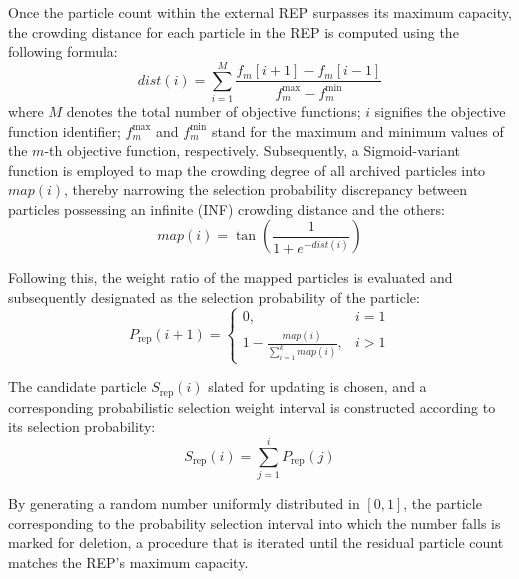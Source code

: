 \documentclass[lettersize,journal]{IEEEtran}
\begin{document}
Once the particle count within the external REP surpasses its maximum capacity, the crowding distance for each particle in the REP is computed using the following formula:
\begin{equation}
    dist(i)=\sum_{i=1}^{M}{\frac{f_m[i+1]-f_m[i-1]}{{f_m^{\text{max}}}-{f_m^{\text{min}}}}}
\end{equation}
where $M$ denotes the total number of objective functions; $i$ signifies the objective function identifier; $f_m^{\text{max}}$ and $f_m^{\text{min}}$ stand for the maximum and minimum values of the $m$-th objective function, respectively. Subsequently, a Sigmoid-variant function is employed to map the crowding degree of all archived particles into $map(i)$, thereby narrowing the selection probability discrepancy between particles possessing an infinite (INF) crowding distance and the others:
\begin{equation}
    map(i)=\tan \left ({\frac{1}{1+{e^{- dist(i)}}}}\right )
\end{equation}

Following this, the weight ratio of the mapped particles is evaluated and subsequently designated as the selection probability of the particle:
\begin{equation}
    {P_{\text{rep}}}(i+1)=\left \{{\begin{array}{ll}0, & i=1\\1-\frac{map(i)}{\sum_{i=1}^{k}map(i)}, & i>1\end{array}}\right .
\end{equation}

The candidate particle $S_{\text{rep}}(i)$ slated for updating is chosen, and a corresponding probabilistic selection weight interval is constructed according to its selection probability:
\begin{equation}
    S_{\text{rep}}(i)=\sum_{j=1}^{i}P_{\text{rep}}(j)
\end{equation}

By generating a random number uniformly distributed in $[0,1]$, the particle corresponding to the probability selection interval into which the number falls is marked for deletion, a procedure that is iterated until the residual particle count matches the REP's maximum capacity.
\end{document}
